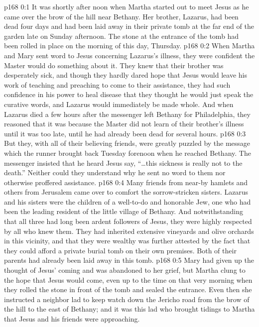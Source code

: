 \author{Midwayer Commission}
\vs p168 0:1 It was shortly after noon when Martha started out to meet Jesus as he came over the brow of the hill near Bethany. Her brother, Lazarus, had been dead four days and had been laid away in their private tomb at the far end of the garden late on Sunday afternoon. The stone at the entrance of the tomb had been rolled in place on the morning of this day, Thursday.
\vs p168 0:2 When Martha and Mary sent word to Jesus concerning Lazarus’s illness, they were confident the Master would do something about it. They knew that their brother was desperately sick, and though they hardly dared hope that Jesus would leave his work of teaching and preaching to come to their assistance, they had such confidence in his power to heal disease that they thought he would just speak the curative words, and Lazarus would immediately be made whole. And when Lazarus died a few hours after the messenger left Bethany for Philadelphia, they reasoned that it was because the Master did not learn of their brother’s illness until it was too late, until he had already been dead for several hours.
\vs p168 0:3 But they, with all of their believing friends, were greatly puzzled by the message which the runner brought back Tuesday forenoon when he reached Bethany. The messenger insisted that he heard Jesus say, \textcolor{ubdarkred}{“\ldots this sickness is really not to the death.”} Neither could they understand why he sent no word to them nor otherwise proffered assistance.
\vs p168 0:4 Many friends from near\hyp{}by hamlets and others from Jerusalem came over to comfort the sorrow\hyp{}stricken sisters. Lazarus and his sisters were the children of a well\hyp{}to\hyp{}do and honorable Jew, one who had been the leading resident of the little village of Bethany. And notwithstanding that all three had long been ardent followers of Jesus, they were highly respected by all who knew them. They had inherited extensive vineyards and olive orchards in this vicinity, and that they were wealthy was further attested by the fact that they could afford a private burial tomb on their own premises. Both of their parents had already been laid away in this tomb.
\vs p168 0:5 Mary had given up the thought of Jesus’ coming and was abandoned to her grief, but Martha clung to the hope that Jesus would come, even up to the time on that very morning when they rolled the stone in front of the tomb and sealed the entrance. Even then she instructed a neighbor lad to keep watch down the Jericho road from the brow of the hill to the east of Bethany; and it was this lad who brought tidings to Martha that Jesus and his friends were approaching.
